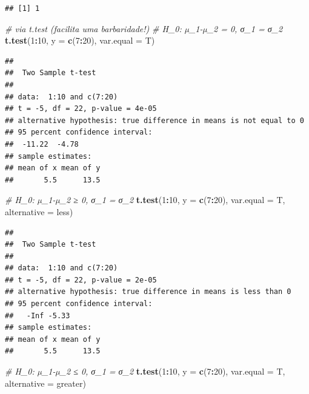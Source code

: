 \documentclass[
]{book}
\newenvironment{Shaded}{\begin{snugshade}}{\end{snugshade}}
\newcommand{\CommentTok}[1]{\textcolor[rgb]{0.56,0.35,0.01}{\textit{#1}}}
\newcommand{\DataTypeTok}[1]{\textcolor[rgb]{0.13,0.29,0.53}{#1}}
\newcommand{\DecValTok}[1]{\textcolor[rgb]{0.00,0.00,0.81}{#1}}
\newcommand{\KeywordTok}[1]{\textcolor[rgb]{0.13,0.29,0.53}{\textbf{#1}}}
\newcommand{\NormalTok}[1]{#1}
\newcommand{\OperatorTok}[1]{\textcolor[rgb]{0.81,0.36,0.00}{\textbf{#1}}}
\newcommand{\StringTok}[1]{\textcolor[rgb]{0.31,0.60,0.02}{#1}}
\theoremstyle{definition}
\theoremstyle{definition}
\theoremstyle{definition}
\theoremstyle{remark}
\begin{document}
\begin{verbatim}
## [1] 1
\end{verbatim}

\begin{Shaded}
\begin{Highlighting}[]
\CommentTok{\# via t.test (facilita uma barbaridade!)}
\CommentTok{\# H\_0: µ\_1{-}µ\_2 = 0, σ\_1 = σ\_2}
\KeywordTok{t.test}\NormalTok{(}\DecValTok{1}\OperatorTok{:}\DecValTok{10}\NormalTok{, }\DataTypeTok{y =} \KeywordTok{c}\NormalTok{(}\DecValTok{7}\OperatorTok{:}\DecValTok{20}\NormalTok{), }\DataTypeTok{var.equal =}\NormalTok{ T)                          }
\end{Highlighting}
\end{Shaded}

\begin{verbatim}
## 
##  Two Sample t-test
## 
## data:  1:10 and c(7:20)
## t = -5, df = 22, p-value = 4e-05
## alternative hypothesis: true difference in means is not equal to 0
## 95 percent confidence interval:
##  -11.22  -4.78
## sample estimates:
## mean of x mean of y 
##       5.5      13.5
\end{verbatim}

\begin{Shaded}
\begin{Highlighting}[]
\CommentTok{\# H\_0: µ\_1{-}µ\_2 ≥ 0, σ\_1 = σ\_2}
\KeywordTok{t.test}\NormalTok{(}\DecValTok{1}\OperatorTok{:}\DecValTok{10}\NormalTok{, }\DataTypeTok{y =} \KeywordTok{c}\NormalTok{(}\DecValTok{7}\OperatorTok{:}\DecValTok{20}\NormalTok{), }\DataTypeTok{var.equal =}\NormalTok{ T, }\DataTypeTok{alternative =} \StringTok{\textquotesingle{}less\textquotesingle{}}\NormalTok{)    }
\end{Highlighting}
\end{Shaded}

\begin{verbatim}
## 
##  Two Sample t-test
## 
## data:  1:10 and c(7:20)
## t = -5, df = 22, p-value = 2e-05
## alternative hypothesis: true difference in means is less than 0
## 95 percent confidence interval:
##   -Inf -5.33
## sample estimates:
## mean of x mean of y 
##       5.5      13.5
\end{verbatim}

\begin{Shaded}
\begin{Highlighting}[]
\CommentTok{\# H\_0: µ\_1{-}µ\_2 ≤ 0, σ\_1 = σ\_2}
\KeywordTok{t.test}\NormalTok{(}\DecValTok{1}\OperatorTok{:}\DecValTok{10}\NormalTok{, }\DataTypeTok{y =} \KeywordTok{c}\NormalTok{(}\DecValTok{7}\OperatorTok{:}\DecValTok{20}\NormalTok{), }\DataTypeTok{var.equal =}\NormalTok{ T, }\DataTypeTok{alternative =} \StringTok{\textquotesingle{}greater\textquotesingle{}}\NormalTok{) }
\end{Highlighting}
\end{Shaded}
\end{document}
